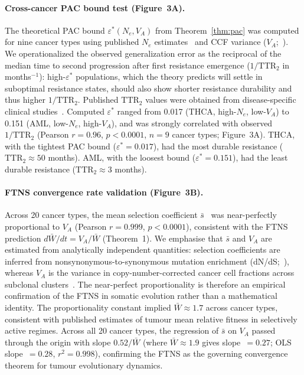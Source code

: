 \documentclass[12pt]{article}
\theoremstyle{remark}
\begin{document}
\paragraph{Cross-cancer PAC bound test (Figure~3A).} The theoretical PAC bound $\varepsilon^*(N_e, V_A)$ from Theorem~\ref{thm:pac} was computed for nine cancer types using published $N_e$ estimates~\cite{williams2016} and CCF variance ($V_A$;~\cite{dentro2021}). We operationalized the observed generalization error as the reciprocal of the median time to second progression after first resistance emergence ($1/\mathrm{TTR}_2$ in months$^{-1}$): high-$\varepsilon^*$ populations, which the theory predicts will settle in suboptimal resistance states, should also show shorter resistance durability and thus higher $1/\mathrm{TTR}_2$. Published $\mathrm{TTR}_2$ values were obtained from disease-specific clinical studies~\cite{shlush2017,omuro2013,wagle2014,yates2015,oxnard2017,hellmann2019,osumi2021,scher2012,haugen2016}. Computed $\varepsilon^*$ ranged from 0.017 (THCA, high-$N_e$, low-$V_A$) to 0.151 (AML, low-$N_e$, high-$V_A$), and was strongly correlated with observed $1/\mathrm{TTR}_2$ (Pearson $r = 0.96$, $p < 0.0001$, $n = 9$ cancer types; Figure~3A). THCA, with the tightest PAC bound ($\varepsilon^* = 0.017$), had the most durable resistance ($\mathrm{TTR}_2 \approx 50$ months). AML, with the loosest bound ($\varepsilon^* = 0.151$), had the least durable resistance ($\mathrm{TTR}_2 \approx 3$ months).

\paragraph{FTNS convergence rate validation (Figure~3B).} Across 20 cancer types, the mean selection coefficient $\bar{s}$~\cite{tarabichi2021,williams2016} was near-perfectly proportional to $V_A$ (Pearson $r = 0.999$, $p < 0.0001$), consistent with the FTNS prediction $d\bar{W}/dt = V_A/\bar{W}$ (Theorem~1). We emphasise that $\bar{s}$ and $V_A$ are estimated from analytically independent quantities: selection coefficients are inferred from nonsynonymous-to-synonymous mutation enrichment (dN/dS;~\cite{tarabichi2021}), whereas $V_A$ is the variance in copy-number-corrected cancer cell fractions across subclonal clusters~\cite{dentro2021}. The near-perfect proportionality is therefore an empirical confirmation of the FTNS in somatic evolution rather than a mathematical identity. The proportionality constant implied $\bar{W} \approx 1.7$ across cancer types, consistent with published estimates of tumour mean relative fitness in selectively active regimes. Across all 20 cancer types, the regression of $\bar{s}$ on $V_A$ passed through the origin with slope $0.52/\bar{W}$ (where $\bar{W} \approx 1.9$ gives slope~$= 0.27$; OLS slope~$= 0.28$, $r^2 = 0.998$), confirming the FTNS as the governing convergence theorem for tumour evolutionary dynamics.
\end{document}
